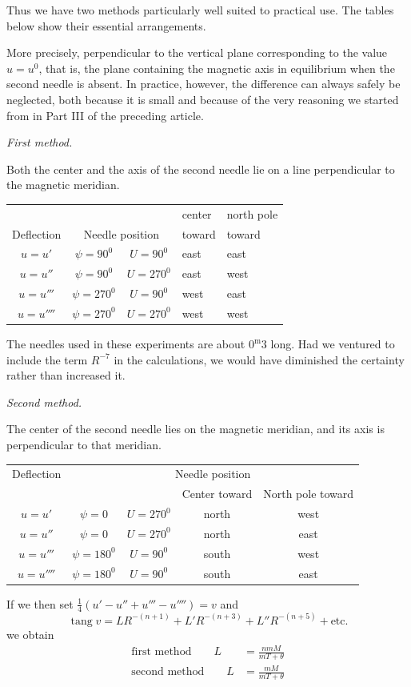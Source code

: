 Thus we have two methods particularly well suited to practical use. The tables below show their essential arrangements.

\expandafter\def\csname HistoricalNoteText11\endcsname{More precisely, perpendicular to the vertical plane corresponding to the value $u=u^0$, that is, the plane containing the magnetic axis in equilibrium when the second needle is absent. In practice, however, the difference can always safely be neglected, both because it is small and because of the very reasoning we started from in Part III of the preceding article.}
\begin{center}
\textit{First method.}

Both the center and the axis of the second needle lie on a line perpendicular to the magnetic meridian.

\begin{tabular}{c|c|c|l|l}
& & &center&north pole\\
Deflection&\multicolumn{2}{c|}{Needle position}&toward&toward\\\hline
$u=u'$&$\psi=90^0$&$U=90^0$&east&east\\
$u=u''$&$\psi=90^0$&$U=270^0$&east&west\\
$u=u'''$&$\psi=270^0$&$U=90^0$&west&east\\
$u=u''''$&$\psi=270^0$&$U=270^0$&west&west
\end{tabular}
\end{center}
\expandafter\def\csname HistoricalNoteText12\endcsname{The needles used in these experiments are about $0^{\mathrm m}3$ long. Had we ventured to include the term $R^{-7}$ in the calculations, we would have diminished the certainty rather than increased it.}
\begin{center}
\textit{Second method.}\par
The center of the second needle lies on the magnetic meridian, and its axis is perpendicular to that meridian.
\begin{tabular}{c|cc|cc}
Deflection&\multicolumn{4}{c}{Needle position}\\
&&&Center toward&North pole toward\\\hline
$u=u'$&$\psi=0$&$U=270^0$&north&west\\
$u=u''$&$\psi=0$&$U=270^0$&north&east\\
$u=u'''$&$\psi=180^0$&$U=90^0$&south&west\\
$u=u''''$&$\psi=180^0$&$U=90^0$&south&east
\end{tabular}
\end{center}

If we then set $\frac14(u'-u''+u'''-u'''')=v$ and
\[
\operatorname{tang}v=LR^{-(n+1)}+L'R^{-(n+3)}+L''R^{-(n+5)}+\text{etc.}
\]
we obtain
\[
\begin{aligned}
\text{first method}\qquad L&=\frac{nmM}{mT+\theta}\\
\text{second method}\qquad L&=\frac{mM}{mT+\theta}
\end{aligned}
\]
